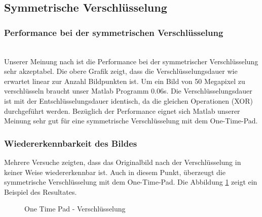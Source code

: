 \documentclass[paper=a4,fontsize=12pt]{scrartcl}
\begin{document}
\subsection{Symmetrische Verschlüsselung}
\subsubsection{Performance bei der symmetrischen Verschlüsselung}
 \\
Unserer Meinung nach ist die Performance bei der symmetrischer Verschlüsselung sehr akzeptabel.
Die obere Grafik zeigt, dass die Verschlüsselungsdauer wie erwartet linear zur Anzahl Bildpunkten ist.
Um ein Bild von 50 Megapixel zu verschlüsseln braucht unser Matlab Programm 0.06s.
Die Verschlüsselungsdauer ist mit der Entschlüsselungsdauer identisch, da die gleichen Operationen (XOR) durchgeführt werden.
Bezüglich der Performance eignet sich Matlab unserer Meinung sehr gut für eine symmetrische Verschlüsselung mit dem One-Time-Pad.

\subsubsection{Wiedererkennbarkeit des Bildes}
Mehrere Versuche zeigten, dass das Originalbild nach der Verschlüsselung in keiner Weise wiedererkennbar ist.
Auch in diesem Punkt, überzeugt die symmetrische Verschlüsselung mit dem One-Time-Pad.
Die Abbildung \ref{sym-enc-result} zeigt ein Beispiel des Resultates.
\begin{figure}[H] 
	\centering
	\caption[One Time Pad - Verschlüsselung]{One Time Pad - Verschlüsselung}  
	\label{sym-enc-result} 
\end{figure}
\end{document}
